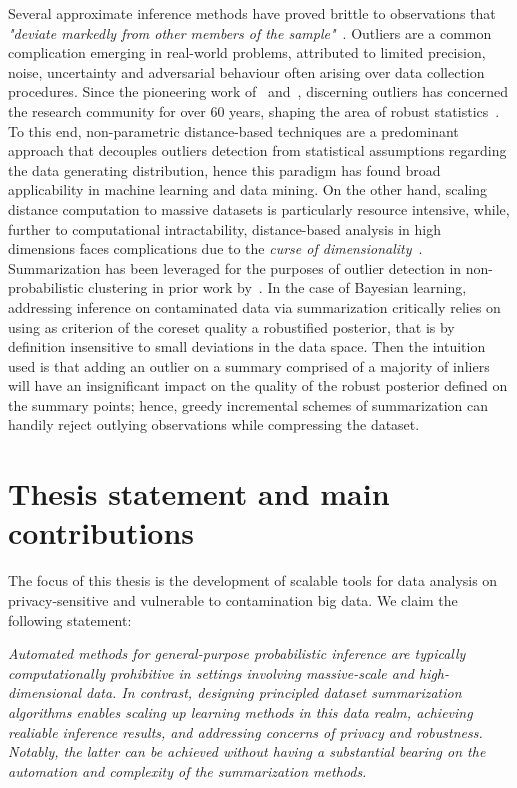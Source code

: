  Several approximate inference methods have proved brittle to observations that \emph{"deviate markedly from other members of the sample"}~\citep{grubbs69}. Outliers are a common complication emerging in real-world problems, attributed to limited precision, noise, uncertainty and adversarial behaviour often arising over data collection procedures. Since the pioneering work of~\textcite{tukey60} and~\textcite{definetti61}, discerning outliers has concerned the research community for over 60 years, shaping the area of robust statistics~\citep{huber09}. To this end, non-parametric distance-based techniques are a predominant approach that decouples outliers detection from statistical assumptions regarding the data generating distribution, hence this paradigm has found broad applicability in machine learning and data mining. On the other hand, scaling distance computation to massive datasets is particularly resource intensive, while, further to computational intractability, distance-based analysis in high dimensions faces complications due to the \emph{curse of dimensionality}~\citep{donoho00,vershynin18,wainwright19}. Summarization has been leveraged for the purposes of outlier detection in non-probabilistic clustering in prior work by~\textcite{lucic16outliers}. In the case of Bayesian learning, addressing inference on contaminated data via summarization critically relies on using as criterion of the coreset quality a robustified posterior, that is by definition insensitive to small deviations in the data space. Then the intuition used is that adding an outlier on a summary comprised of a majority of inliers will have an insignificant impact on the quality of the robust posterior defined on the summary points; hence, greedy incremental schemes of summarization can handily reject outlying observations while compressing the dataset.

\section{Thesis statement and main contributions}
\label{sec:thesis-goals}

The focus of this thesis is the development of scalable tools for data analysis on privacy-sensitive and vulnerable to contamination big data. We claim the following statement:

\emph{Automated methods for general-purpose probabilistic inference are typically computationally prohibitive in settings involving massive-scale and high-dimensional data. In contrast, designing principled dataset summarization algorithms enables scaling up learning methods in this data realm, achieving realiable inference results, and addressing concerns of privacy and robustness. Notably, the latter can be achieved without having a substantial bearing on the automation and complexity of the summarization methods.}

